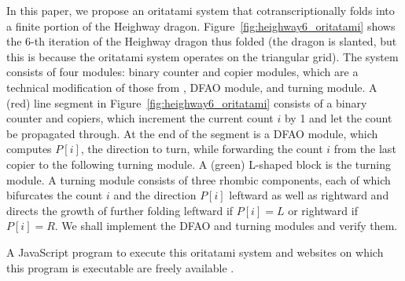 In this paper, we propose an oritatami system that cotranscriptionally folds into a finite portion of the Heighway dragon. 
Figure~\ref{fig:heighway6_oritatami} shows the 6-th iteration of the Heighway dragon thus folded (the dragon is slanted, but this is because the oritatami system operates on the triangular grid). 
The system consists of four modules: binary counter and copier modules, which are a technical modification of those from \cite{GeMeScSe2016}, DFAO module, and turning module. 
A (red) line segment in Figure~\ref{fig:heighway6_oritatami} consists of a binary counter and copiers, which increment the current count $i$ by 1 and let the count be propagated through. 
At the end of the segment is a DFAO module, which computes $P[i]$, the direction to turn, while forwarding the count $i$ from the last copier to the following turning module. 
A (green) L-shaped block is the turning module. 
A turning module consists of three rhombic components, each of which bifurcates the count $i$ and the direction $P[i]$ leftward as well as rightward and directs the growth of further folding leftward if $P[i] = L$ or rightward if $P[i] = R$. 
We shall implement the DFAO and turning modules and verify them. 

A JavaScript program to execute this oritatami system and websites on which this program is executable are freely available \cite{heighway_web}. 

